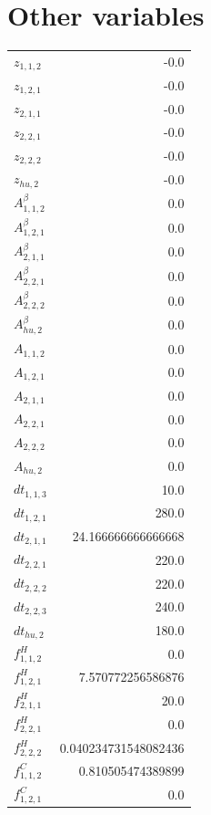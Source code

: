 \documentclass{article}%
\makeatletter
\let\mcnewpage=\newpage%
\newcommand{\TrickSupertabularIntoMulticols}{%
\renewcommand\newpage{%
\if@firstcolumn%
\hrule width\linewidth height0pt%
\columnbreak%
\else%
\mcnewpage%
\fi%
}%
}%
\makeatother
\begin{document}
\section{Other variables}%
\thispagestyle{plain}%
\begin{multicols*}{3}%
\TrickSupertabularIntoMulticols%
%
\begin{supertabular}{lr}%
	$z_{1,1,2}$ & -0.0 \\%
	$z_{1,2,1}$ & -0.0 \\%
	$z_{2,1,1}$ & -0.0 \\%
	$z_{2,2,1}$ & -0.0 \\%
	$z_{2,2,2}$ & -0.0 \\%
	$z_{hu,2}$ & -0.0 \\%
	$A_{1,1,2}^{\beta}$ & 0.0 \\%
	$A_{1,2,1}^{\beta}$ & 0.0 \\%
	$A_{2,1,1}^{\beta}$ & 0.0 \\%
	$A_{2,2,1}^{\beta}$ & 0.0 \\%
	$A_{2,2,2}^{\beta}$ & 0.0 \\%
	$A_{hu,2}^{\beta}$ & 0.0 \\%
	$A_{1,1,2}$ & 0.0 \\%
	$A_{1,2,1}$ & 0.0 \\%
	$A_{2,1,1}$ & 0.0 \\%
	$A_{2,2,1}$ & 0.0 \\%
	$A_{2,2,2}$ & 0.0 \\%
	$A_{hu,2}$ & 0.0 \\%
	$dt_{1,1,3}$ & 10.0 \\%
	$dt_{1,2,1}$ & 280.0 \\%
	$dt_{2,1,1}$ & 24.166666666666668 \\%
	$dt_{2,2,1}$ & 220.0 \\%
	$dt_{2,2,2}$ & 220.0 \\%
	$dt_{2,2,3}$ & 240.0 \\%
	$dt_{hu,2}$ & 180.0 \\%
	$f_{1,1,2}^{H}$ & 0.0 \\%
	$f_{1,2,1}^{H}$ & 7.570772256586876 \\%
	$f_{2,1,1}^{H}$ & 20.0 \\%
	$f_{2,2,1}^{H}$ & 0.0 \\%
	$f_{2,2,2}^{H}$ & 0.040234731548082436 \\%
	$f_{1,1,2}^{C}$ & 0.810505474389899 \\%
	$f_{1,2,1}^{C}$ & 0.0 \\%

\end{supertabular}
\end{multicols*}
\end{document}
